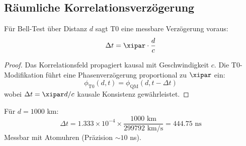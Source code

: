 \begin{table}[h]
	\centering
	\caption{T0 CHSH-Vorhersagen für Multi-Qubit-Systeme}
	\label{tab:chsh_predictions}
\end{table}

\subsection{Räumliche Korrelationsverzögerung}

\begin{proposition}
	Für Bell-Test über Distanz $d$ sagt T0 eine messbare Verzögerung voraus:
	\begin{equation}
		\Delta t = \xipar \cdot \frac{d}{c}
		\label{eq:spatial_delay}
	\end{equation}
\end{proposition}

\begin{proof}
	Das Korrelationsfeld propagiert kausal mit Geschwindigkeit $c$. Die T0-Modifikation führt eine Phasenverzögerung proportional zu $\xipar$ ein:
	\begin{equation}
		\phi_{\text{T0}}(d, t) = \phi_{\text{QM}}(d, t - \Delta t)
	\end{equation}
	wobei $\Delta t = \xipar d/c$ kausale Konsistenz gewährleistet.
\end{proof}

\begin{experimentbox}[Satellitentest]
	Für $d = 1000$ km:
	\begin{equation}
		\Delta t = 1.333 \times 10^{-4} \times \frac{1000 \text{ km}}{299792 \text{ km/s}} = 444.75 \text{ ns}
	\end{equation}
	Messbar mit Atomuhren (Präzision $\sim 10$ ns).
\end{experimentbox}

